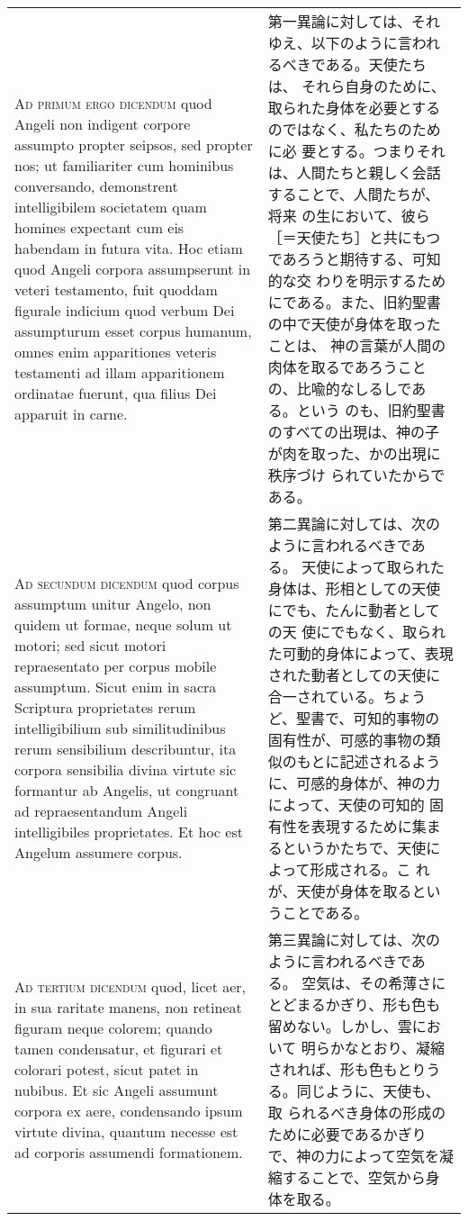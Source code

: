 \documentclass[10pt]{jsarticle} %
\begin{document}
\begin{longtable}{p{21em}p{21em}}
\\


{\scshape Ad primum ergo dicendum} quod Angeli non
indigent corpore assumpto propter seipsos, sed propter nos; ut
familiariter cum hominibus conversando, demonstrent intelligibilem
societatem quam homines expectant cum eis habendam in futura vita. Hoc
etiam quod Angeli corpora assumpserunt in veteri testamento, fuit
quoddam figurale indicium quod verbum Dei assumpturum esset corpus
humanum, omnes enim apparitiones veteris testamenti ad illam
apparitionem ordinatae fuerunt, qua filius Dei apparuit in carne.

&

第一異論に対しては、それゆえ、以下のように言われるべきである。天使たちは、
それら自身のために、取られた身体を必要とするのではなく、私たちのために必
要とする。つまりそれは、人間たちと親しく会話することで、人間たちが、将来
の生において、彼ら［＝天使たち］と共にもつであろうと期待する、可知的な交
わりを明示するためにである。また、旧約聖書の中で天使が身体を取ったことは、
 神の言葉が人間の肉体を取るであろうことの、比喩的なしるしである。という
 のも、旧約聖書のすべての出現は、神の子が肉を取った、かの出現に秩序づけ
 られていたからである。

\\


{\scshape Ad secundum dicendum} quod corpus assumptum
unitur Angelo, non quidem ut formae, neque solum ut motori; sed sicut
motori repraesentato per corpus mobile assumptum. Sicut enim in sacra
Scriptura proprietates rerum intelligibilium sub similitudinibus rerum
sensibilium describuntur, ita corpora sensibilia divina virtute sic
formantur ab Angelis, ut congruant ad repraesentandum Angeli
intelligibiles proprietates. Et hoc est Angelum assumere corpus.

&

第二異論に対しては、次のように言われるべきである。
天使によって取られた身体は、形相としての天使にでも、たんに動者としての天
 使にでもなく、取られた可動的身体によって、表現された動者としての天使に
 合一されている。ちょうど、聖書で、可知的事物の固有性が、可感的事物の類
 似のもとに記述されるように、可感的身体が、神の力によって、天使の可知的
 固有性を表現するために集まるというかたちで、天使によって形成される。こ
 れが、天使が身体を取るということである。


\\


{\scshape Ad tertium dicendum} quod, licet aer, in sua
raritate manens, non retineat figuram neque colorem; quando tamen
condensatur, et figurari et colorari potest, sicut patet in nubibus. Et
sic Angeli assumunt corpora ex aere, condensando ipsum virtute divina,
quantum necesse est ad corporis assumendi formationem.

&

第三異論に対しては、次のように言われるべきである。
空気は、その希薄さにとどまるかぎり、形も色も留めない。しかし、雲において
 明らかなとおり、凝縮されれば、形も色もとりうる。同じように、天使も、取
 られるべき身体の形成のために必要であるかぎりで、神の力によって空気を凝
 縮することで、空気から身体を取る。


\end{longtable}
\newpage
\end{document}
